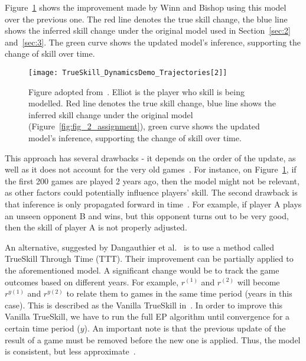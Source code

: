 \documentclass[a4paper,11pt]{article}
\theoremstyle{mytheor}
\begin{document}
Figure~\ref{fig:mbml_dynamic_skill_update} shows the improvement made by Winn and Bishop using this model over the previous one. The red line denotes the true skill change, the blue line shows the inferred skill change under the original model used in Section~\ref{sec:2} and~\ref{sec:3}. The green curve shows the updated model's inference, supporting the change of skill over time.

\begin{figure}[htpb!]
    \centering
    \texttt{[image: TrueSkill\_DynamicsDemo\_Trajectories[2]]}
    \caption{Figure adopted from~\cite{bishop2013model}. Elliot is the player who skill is being modelled. Red line denotes the true skill change, blue line shows the inferred skill change under the original model (Figure~\ref{fig:fig_2_assignment}), green curve shows the updated model's inference, supporting the change of skill over time.}
    \label{fig:mbml_dynamic_skill_update}
\end{figure}

This approach has several drawbacks - it depends on the order of the update, as well as it does not account for the very old games~\cite{dangauthier2007trueskill}. For instance, on Figure~\ref{fig:mbml_dynamic_skill_update}, if the first 200 games are played 2 years ago, then the model might not be relevant, as other factors could potentially influence players' skill. The second drawback is that inference is only propagated forward in time~\cite{dangauthier2007trueskill}. For example, if player A plays an unseen opponent B and wins, but this opponent turns out to be very good, then the skill of player A is not properly adjusted.

An alternative, suggested by Dangauthier et al.~\cite{dangauthier2007trueskill} is to use a method called TrueSkill Through Time (TTT). Their improvement can be partially applied to the aforementioned model. A significant change would be to track the game outcomes based on different years. For example, $r^{(1)}$ and $r^{(2)}$ will become $r^{y(1)}$ and $r^{y(2)}$ to relate them to games in the same time period (years in this case). This is described as the Vanilla TrueSkill in~\cite{dangauthier2007trueskill}. In order to improve this Vanilla TrueSkill, we have to run the full EP algorithm until convergence for a certain time period ($y$). An important note is that the previous update of the result of a game must be removed before the new one is applied. Thus, the model is consistent, but less approximate~\cite{dangauthier2007trueskill}.
\end{document}
